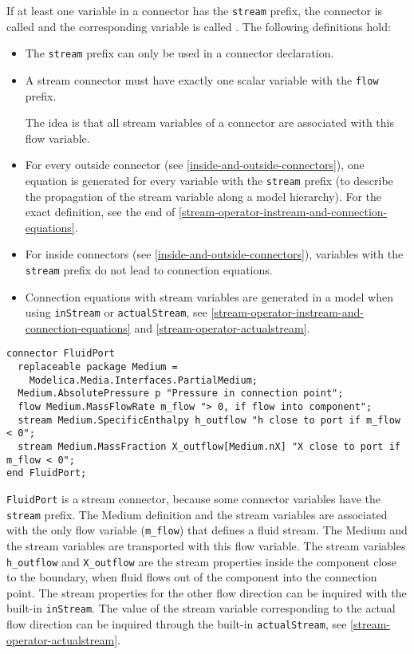 If at least one variable in a connector has the \lstinline!stream! prefix,
the connector is called  and the corresponding
variable is called . The following definitions hold:
\begin{itemize}
\item
  The \lstinline!stream! prefix can only be used in a connector
  declaration.
\item
  A stream connector must have exactly one scalar variable with the \lstinline!flow! prefix.
  \begin{nonnormative}
  The idea is that all stream variables of a connector are associated with this flow variable.
  \end{nonnormative}
\item
  For every outside connector (see \autoref{inside-and-outside-connectors}), one
  equation is generated for every variable with the \lstinline!stream!
  prefix (to describe the propagation of the stream variable
  along a model hierarchy). For the exact definition, see the end of
  \autoref{stream-operator-instream-and-connection-equations}.
\item
  For inside connectors (see \autoref{inside-and-outside-connectors}), variables
  with the \lstinline!stream! prefix do not lead to connection equations.
\item
  Connection equations with stream variables are generated in a model when using \lstinline!inStream! or \lstinline!actualStream!,
  see \autoref{stream-operator-instream-and-connection-equations} and \autoref{stream-operator-actualstream}.
\end{itemize}

\begin{example}
\begin{lstlisting}[language=modelica]
connector FluidPort
  replaceable package Medium =
    Modelica.Media.Interfaces.PartialMedium;
  Medium.AbsolutePressure p "Pressure in connection point";
  flow Medium.MassFlowRate m_flow "> 0, if flow into component";
  stream Medium.SpecificEnthalpy h_outflow "h close to port if m_flow < 0";
  stream Medium.MassFraction X_outflow[Medium.nX] "X close to port if m_flow < 0";
end FluidPort;
\end{lstlisting}
\lstinline!FluidPort! is a stream connector, because some connector variables
have the \lstinline!stream! prefix. The Medium definition and the stream
variables are associated with the only flow variable (\lstinline!m_flow!) that
defines a fluid stream. The Medium and the stream variables are
transported with this flow variable. The stream variables \lstinline!h_outflow! and
\lstinline!X_outflow! are the stream properties inside the component close to the
boundary, when fluid flows out of the component into the connection
point. The stream properties for the other flow direction can be
inquired with the built-in \lstinline!inStream!. The value of
the stream variable corresponding to the actual flow direction can be
inquired through the built-in \lstinline!actualStream!, see
\autoref{stream-operator-actualstream}.
\end{example}

